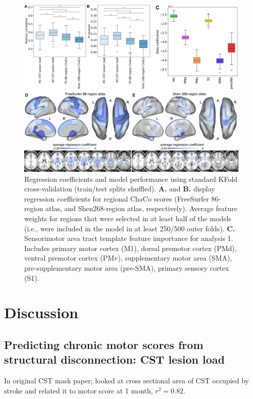 \documentclass[10pt]{article}
\begin{document}
\begin{figure}[htp]
\centering
\includegraphics[width=1\linewidth]{figures/Analysis2.png}
\caption{Regression coefficients and model performance using standard KFold cross-validation (train/test splits shuffled). \textbf{A.} and \textbf{B.} display regression coefficients for regional ChaCo scores (FreeSurfer 86-region atlas, and Shen268-region atlas, respectively). Average feature weights for regions that were selected in at least half of the models (i.e., were included in the model in at least 250/500 outer folds). \textbf{C.} Sensorimotor area tract template feature importance for analysis 1. Includes primary motor cortex (M1), dorsal premotor cortex (PMd), ventral premotor cortex (PMv), supplementary motor area (SMA), pre-supplementary motor area (pre-SMA), primary sensory cortex (S1).}
\label{nemotool}
\end{figure}



\section{Discussion}

\subsection*{Predicting chronic motor scores from structural disconnection: CST lesion load}
In \cite{Pineiro2000-dv} original CST mask paper; looked at cross sectional area of CST occupied by stroke and related it to motor score at 1 month, $r^2 = 0.82$.
\end{document}
